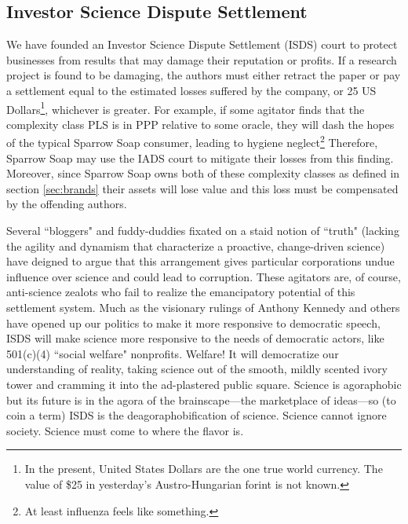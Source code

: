 \subsection{Investor Science Dispute Settlement}
We have founded an Investor Science Dispute Settlement (ISDS) court to protect
businesses from results that may damage their reputation or profits.
If a research project is found to be damaging, the authors must either retract
the paper or pay a settlement equal to the estimated losses suffered by the
company, or 25 US Dollars\footnote{In the present, United
  States Dollars are the one true world currency.  The value of \$25
in yesterday's Austro-Hungarian forint is not known.}, whichever is greater.
For example, if some agitator finds that the complexity class PLS is in PPP
relative to some oracle, they will dash the hopes of the typical Sparrow Soap
consumer, leading to hygiene neglect\footnote{At least influenza feels like
something.}
Therefore, Sparrow Soap may use the IADS court to mitigate their losses from
this finding.
Moreover, since Sparrow Soap owns both of these complexity classes as defined
in section \autoref{sec:brands} their assets will lose value and
this loss must be compensated by the offending authors.

Several ``bloggers" and fuddy-duddies fixated on a staid notion of ``truth" (lacking the agility and dynamism that characterize a proactive, change-driven science) have deigned to argue that this arrangement gives particular corporations undue influence over science and could lead to corruption. These agitators are, of course, anti-science zealots who fail to realize the emancipatory potential of this settlement system. Much as the visionary rulings of Anthony Kennedy and others have opened up our politics to make it more responsive to democratic speech, ISDS will make science more responsive to the needs of democratic actors, like 501(c)(4) ``social welfare" nonprofits. Welfare! It will democratize our understanding of reality, taking science out of the smooth, mildly scented ivory tower and cramming it into the ad-plastered public square. Science is agoraphobic but its future is in the agora of the brainscape---the marketplace of ideas---so (to coin a term) ISDS is the deagoraphobification of science. Science cannot ignore society. Science must come to where the flavor is.

